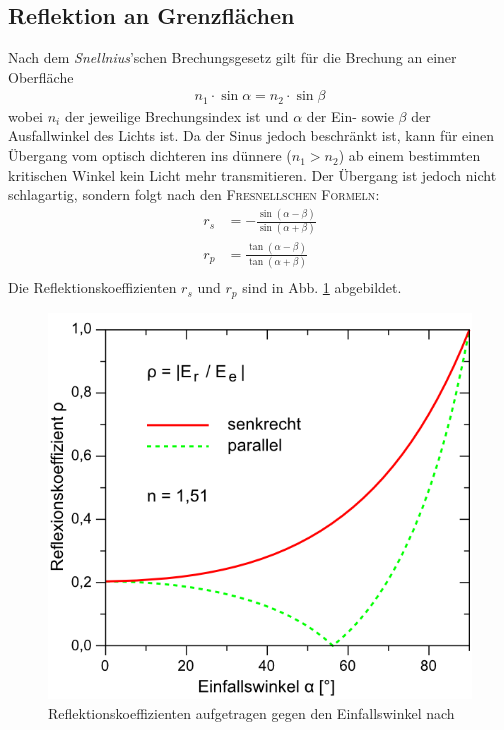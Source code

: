 \documentclass[12pt,a4paper,titlepage,headinclude,bibtotoc]{scrartcl}
\begin{document}
\subsection{Reflektion an Grenzflächen}
Nach dem \textit{Snellnius}'schen Brechungsgesetz gilt für die Brechung an einer Oberfläche
\begin{align}
	n_1\cdot\sin\alpha=n_2\cdot\sin\beta\label{eq:snellnius}
\end{align}
wobei $n_i$ der jeweilige Brechungsindex ist und $\alpha$ der Ein- sowie $\beta$ der Ausfallwinkel des Lichts ist.
Da der Sinus jedoch beschränkt ist, kann für einen Übergang vom optisch dichteren ins dünnere ($n_1 > n_2$) ab einem bestimmten kritischen Winkel kein Licht mehr transmitieren.
Der Übergang ist jedoch nicht schlagartig, sondern folgt nach \cite[S. 238]{demtroeder2} den \textsc{Fresnellschen Formeln}:
\begin{align}
	r_s &= -\frac{\sin (\alpha -\beta )}{\sin ( \alpha + \beta )}\label{eq:rs}\\
	r_p &= \frac{\tan (\alpha - \beta )}{\tan ( \alpha + \beta )}\label{eq:rp}\\
\end{align}
Die Reflektionskoeffizienten $r_s$ und $r_p$ sind in Abb. \ref{fig:reflektion} abgebildet.


\begin{figure}[h]
	\centering
	\includegraphics{fresnelkoeff_lp}
	\caption{Reflektionskoeffizienten aufgetragen gegen den Einfallswinkel nach \cite[28.3.2015, 15 Uhr]{lp20}}
	\label{fig:reflektion}
\end{figure}
\end{document}
